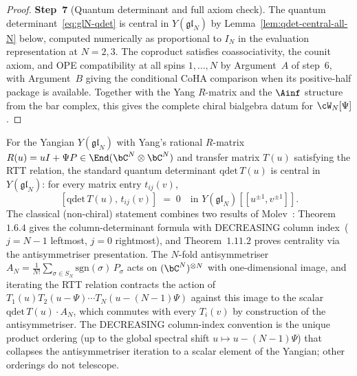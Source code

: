 \begin{proof}
\medskip
\noindent
\textbf{Step~7}
(Quantum determinant and full axiom check).
The quantum determinant~\eqref{eq:glN-qdet} is central
in $Y(\mathfrak{gl}_N)$ by
Lemma~\ref{lem:qdet-central-all-N} below,
computed numerically as proportional to
$I_N$ in the evaluation representation at $N = 2, 3$.
The coproduct satisfies coassociativity, the counit axiom,
and OPE compatibility at all spins $1, \ldots, N$ by
Argument~$A$ of step~6, with Argument~$B$ giving the
conditional CoHA comparison when its positive-half package is
available. Together with
the Yang $R$-matrix and the $\Ainf$ structure from the bar
complex, this gives the complete chiral bialgebra
datum for $\cW_N[\Psi]$.
\end{proof}

\begin{lemma}
\label{lem:qdet-central-all-N}
\ClaimStatusProvedElsewhere
For the Yangian $Y(\mathfrak{gl}_N)$ with Yang's rational
$R$-matrix $R(u) = u I + \Psi P \in \End(\bC^N \otimes \bC^N)$
and transfer matrix $T(u)$ satisfying the RTT relation, the standard
quantum determinant $\mathrm{qdet}\, T(u)$ is central
in $Y(\mathfrak{gl}_N)$: for every matrix entry $t_{ij}(v)$,
\[
 [\mathrm{qdet}\, T(u),\, t_{ij}(v)] \;=\; 0
 \quad \text{in } Y(\mathfrak{gl}_N)[[u^{\pm1}, v^{\pm1}]].
\]
The classical (non-chiral) statement combines two results of
Molev~\textup{\cite{Molev07}}: Theorem~$1.6.4$ gives the
column-determinant formula with DECREASING column
index~\textup{(}$j = N{-}1$ leftmost, $j = 0$ rightmost\textup{)},
and Theorem~$1.11.2$ proves centrality via the antisymmetriser
presentation. The $N$-fold antisymmetriser
$A_N = \frac{1}{N!}\sum_{\sigma\in S_N}
\mathrm{sgn}(\sigma)\, P_\sigma$ acts on
$(\bC^N)^{\otimes N}$ with one-dimensional image, and iterating the
RTT relation contracts the action of $T_1(u)T_2(u-\Psi)\cdots
T_N(u-(N-1)\Psi)$ against this image to the scalar
$\mathrm{qdet}\, T(u) \cdot A_N$, which commutes with every
$T_i(v)$ by construction of the antisymmetriser. The DECREASING
column-index convention is the unique product ordering
\textup{(}up to the global spectral shift
$u \mapsto u - (N{-}1)\Psi$\textup{)} that collapses the
antisymmetriser iteration to a scalar element of the Yangian; other
orderings do not telescope.


\end{lemma}
